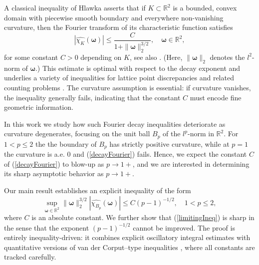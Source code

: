 \documentclass{amsart}
\numberwithin{equation}{section}
\begin{document}
A classical inequality of Hlawka \cite{Hlawka} asserts that if $K\subset\mathbb{R}^2$ is a bounded, convex domain with piecewise smooth boundary and everywhere non-vanishing curvature, then the Fourier transform of its characteristic function satisfies
\begin{equation}
    \label{decayFourier}
    |\widehat{\chi_K}(\boldsymbol{\omega})|\le \frac{C}{1+\|\boldsymbol{\omega}\|_2^{3/2}},\quad\boldsymbol{\omega}\in\mathbb{R}^2,
\end{equation}
for some constant $C>0$ depending on $K$, see also \cite{Herz,Randol1,Randol2}. (Here, $\|\boldsymbol{\omega}\|_2$ denotes the $l^2$-norm of $\boldsymbol{\omega}$.)
This estimate is optimal with respect to the decay exponent and underlies a variety of inequalities for lattice point discrepancies and related counting problems \cite{Iosevich1, Stein, SteinShak}. The curvature assumption is essential: if curvature vanishes, the inequality generally fails, indicating that the constant $C$ must encode fine geometric information.

In this work we study how such Fourier decay inequalities deteriorate as curvature degenerates, focusing on the unit ball $B_p$ of the $l^p$-norm in $\mathbb{R}^2$. For $1<p\le 2$ the the boundary of $B_p$ has strictly positive curvature, while at $p=1$ the curvature is a.e. 0 and (\ref{decayFourier}) fails. Hence, we expect the constant $C$ of (\ref{decayFourier}) to blow-up as $p\rightarrow1+$, and we are interested in determining its sharp asymptotic behavior as $p\rightarrow1+$.


Our main result establishes an explicit inequality of the form
\begin{equation}
    \label{limitingIneq}
    \sup_{\boldsymbol{\omega}\in\mathbb{R}^2}\|\boldsymbol{\omega}\|_2^{3/2}|\widehat{\chi_{B_p}}(\boldsymbol{\omega})|\le C(p-1)^{-1/2}, \quad 1<p\le 2,
\end{equation}
where $C$ is an absolute constant. We further show that (\ref{limitingIneq}) is sharp in the sense that the exponent $(p-1)^{-1/2}$ cannot be improved. The proof is entirely inequality-driven: it combines explicit oscillatory integral estimates with quantitative versions of van der Corput–type inequalities \cite{Rogers}, where all constants are tracked carefully.
\end{document}

